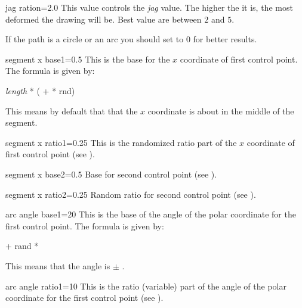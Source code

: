 \documentclass[a4paper]{article}
\begin{document}
\begin{docKey}{jag ration}{=}{2.0}
  This value controls the \textit{jag} value. The higher the it is, the most
  deformed the drawing will be. Best value are between $2$ and $5$.

  If the path is a circle or an arc you should set  to
  $0$ for better results.
\end{docKey}


\begin{docKey}{segment x base1}{=}{0.5}
  This is the base for the $x$ coordinate of first control point. The
  formula is given by:

  \textit{length} *
  ( +  * rnd)

  This means by default that that the $x$ coordinate is about in the middle
  of the segment.
\end{docKey}

\begin{docKey}{segment x ratio1}{=}{0.25}
  This is the randomized ratio part of the $x$ coordinate of first control
  point (see ).
\end{docKey}

\begin{docKey}{segment x base2}{=}{0.5}
  Base for second control point (see ).
\end{docKey}

\begin{docKey}{segment x ratio2}{=}{0.25}
  Random ratio for second control point (see ).
\end{docKey}


\begin{docKey}{arc angle base1}{=}{20}
  This is the base of the angle of the polar coordinate for the first
  control point. The formula is given by:

   + rand * 

  This means that the angle is  $\pm$
  .
\end{docKey}

\begin{docKey}{arc angle ratio1}{=}{10}
  This is the ratio (variable) part of the angle of the polar coordinate for
  the first control point (see ).
\end{docKey}
\end{document}
